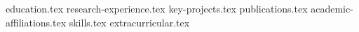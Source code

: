 \documentclass[11pt, a4paper]{awesome-cv}
\newcommand*{\sectiondir}{resume/}
\begin{document}
\makecvheader

{education.tex}
{research-experience.tex}
{key-projects.tex}
{publications.tex}
{academic-affiliations.tex}
{skills.tex}
{extracurricular.tex}
\end{document}
